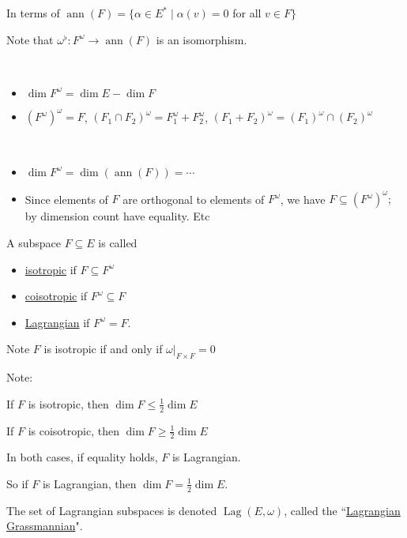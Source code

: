 \documentclass[x11names,reqno,14pt]{extarticle}
\DeclareMathOperator{\ann}{ann}
\DeclareMathOperator{\Lag}{Lag}
\begin{document}
In terms of $\ann(F) = \{\alpha\in E^* \mid \alpha(v) = 0$ for all $v \in F\}$

Note that $\omega^\flat:F^\omega \to \ann(F)$ is an isomorphism.

\prop
\,
\begin{itemize}

\item $\dim F^\omega = \dim E - \dim F$

\item $(F^\omega)^\omega = F$, $(F_1 \cap F_2)^\omega = F_1^\omega + F_2^\omega$, $(F_1 + F_2)^\omega = (F_1)^\omega \cap (F_2)^\omega$

\end{itemize}

\proof
\,
\begin{itemize}

\item $\dim F^\omega = \dim(\ann(F)) = \cdots$

\item Since elements of $F$ are orthogonal to elements of $F^\omega$, we have $F\subseteq (F^\omega)^\omega;$ by dimension count have equality. Etc

\end{itemize}


A subspace $F \subseteq E$ is called
\begin{itemize}

\item \underline{isotropic} if $F \subseteq F^\omega$

\item \underline{coisotropic} if $F^\omega \subseteq F$

\item \underline{Lagrangian} if $F^\omega = F$. 

\end{itemize}

Note $F$ is isotropic if and only if $\omega|_{F\times F} = 0$

Note: 

If $F$ is isotropic, then $\dim F \leq \frac12\dim E$

If $F$ is coisotropic, then $\dim F \geq \frac12\dim E$

In both cases, if equality holds, $F$ is Lagrangian. 

So if $F$ is Lagrangian, then $\dim F = \frac12 \dim E$.

 The set of Lagrangian subspaces is denoted $\Lag(E,\omega)$, called the ``\underline{Lagrangian Grassmannian}". 
\end{document}
